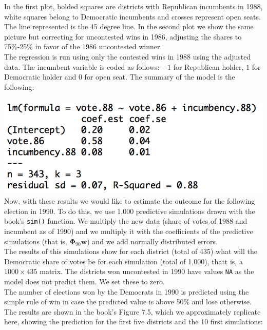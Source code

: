 \documentclass[a4paper, 11pt]{article}
\begin{document}
In the first plot, bolded squares are districts with Republican incumbents in 1988, white squares belong to Democratic incumbents and crosses represent open seats. The line represented is the 45 degree line. In the second plot we show the same picture but correcting for uncontested wins in 1986, adjusting the shares to 75\%-25\% in favor of the 1986 uncontested winner.\\
\newline The regression is run using only the contested wins in 1988 using the adjusted data. The incumbent variable is coded as follows: $-1$ for Republican holder, $1$ for Democratic holder and $0$ for open seat. The summary of the model is the following:\\
\newline \\
\includegraphics[scale=0.7]{plot_ex4_4.png}
\newline \\
\newline Now, with these results we would like to estimate the outcome for the following election in 1990. To do this, we use 1,000 predictive simulations drawn with the book's \texttt{sim()} function. We multiply the new data (share of votes of 1988 and incumbent as of 1990) and we multiply it with the coefficients of the predictive simulations (that is, $\mathbf{\Phi}_{90} \mathbf{w}$) and we add normally distributed errors.\\
\newline The results of this simulations show for each district (total of 435) what will the Democratic share of votes be for each simulation (total of 1,000), thatt is, a $1000 \times 435$ matrix. The districts won uncontested in 1990 have values \texttt{NA} as the model does not predict them. We set these to zero.\\
\newline The number of elections won by the Democrats in 1990 is predicted using the simple rule of win in case the predicted value is above 50\% and lose otherwise. The results are shown in the book's Figure 7.5, which we approximately replicate here, showing the prediction for the first five districts and the 10 first simulations:
\end{document}
